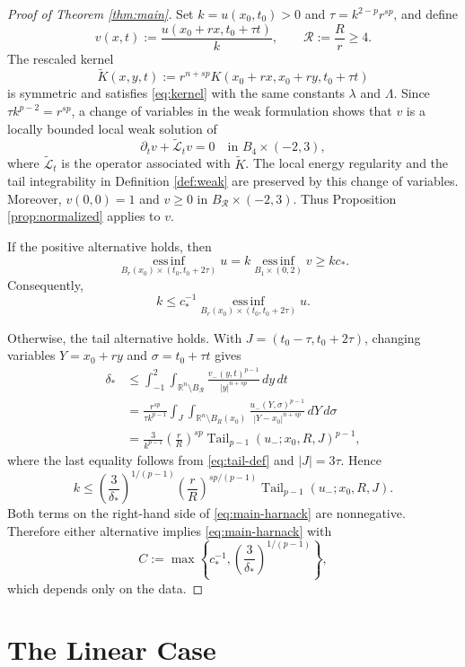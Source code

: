 \documentclass[10pt]{amsart}
\theoremstyle{plain}
\theoremstyle{definition}
\theoremstyle{remark}
\numberwithin{equation}{section}
\newcommand{\R}{\mathbb R}
\begin{document}
\begin{proof}[Proof of Theorem \ref{thm:main}]
Set $k=u(x_0,t_0)>0$ and $\tau=k^{2-p}r^{sp}$, and define
\[
v(x,t):=\frac{u(x_0+rx,t_0+\tau t)}{k},
\qquad \mathcal R:=\frac Rr\ge4.
\]
The rescaled kernel
\[
\widetilde K(x,y,t)
:=r^{n+sp}K(x_0+rx,x_0+ry,t_0+\tau t)
\]
is symmetric and satisfies \eqref{eq:kernel} with the same constants
$\lambda$ and $\Lambda$. Since $\tau k^{p-2}=r^{sp}$, a change of
variables in the weak formulation shows that $v$ is a locally bounded
local weak solution of
\[
\partial_t v+\widetilde{\mathcal L}_t v=0
\quad\text{in }B_4\times(-2,3),
\]
where $\widetilde{\mathcal L}_t$ is the operator associated with
$\widetilde K$. The local energy regularity and the tail integrability
in Definition \ref{def:weak} are preserved by this change of variables.
Moreover, $v(0,0)=1$ and $v\ge0$ in
$B_{\mathcal R}\times(-2,3)$. Thus Proposition \ref{prop:normalized}
applies to $v$.

If the positive alternative holds, then
\[
\operatorname*{ess\,inf}_{B_r(x_0)\times(t_0,t_0+2\tau)}u
=k\operatorname*{ess\,inf}_{B_1\times(0,2)}v
\ge kc_*.
\]
Consequently,
\[
k\le c_*^{-1}
\operatorname*{ess\,inf}_{B_r(x_0)\times(t_0,t_0+2\tau)}u.
\]

Otherwise, the tail alternative holds. With
$J=(t_0-\tau,t_0+2\tau)$, changing variables
$Y=x_0+ry$ and $\sigma=t_0+\tau t$ gives
\begin{align*}
\delta_*
&\le\int_{-1}^2\int_{\R^n\setminus B_{\mathcal R}}
\frac{v_-(y,t)^{p-1}}{|y|^{n+sp}}\,dy\,dt\\
&=\frac{r^{sp}}{\tau k^{p-1}}
\int_J\int_{\R^n\setminus B_R(x_0)}
\frac{u_-(Y,\sigma)^{p-1}}{|Y-x_0|^{n+sp}}\,dY\,d\sigma\\
&=\frac{3}{k^{p-1}}\left(\frac rR\right)^{sp}
\operatorname{Tail}_{p-1}(u_-;x_0,R,J)^{p-1},
\end{align*}
where the last equality follows from \eqref{eq:tail-def} and
$|J|=3\tau$. Hence
\[
k\le\left(\frac{3}{\delta_*}\right)^{1/(p-1)}
\left(\frac rR\right)^{sp/(p-1)}
\operatorname{Tail}_{p-1}(u_-;x_0,R,J).
\]
Both terms on the right-hand side of \eqref{eq:main-harnack} are
nonnegative. Therefore either alternative implies
\eqref{eq:main-harnack} with
\[
C:=\max\left\{c_*^{-1},
\left(\frac{3}{\delta_*}\right)^{1/(p-1)}\right\},
\]
which depends only on the data.
\end{proof}

\appendix
\section{The Linear Case}\label{app:linear}
\end{document}
